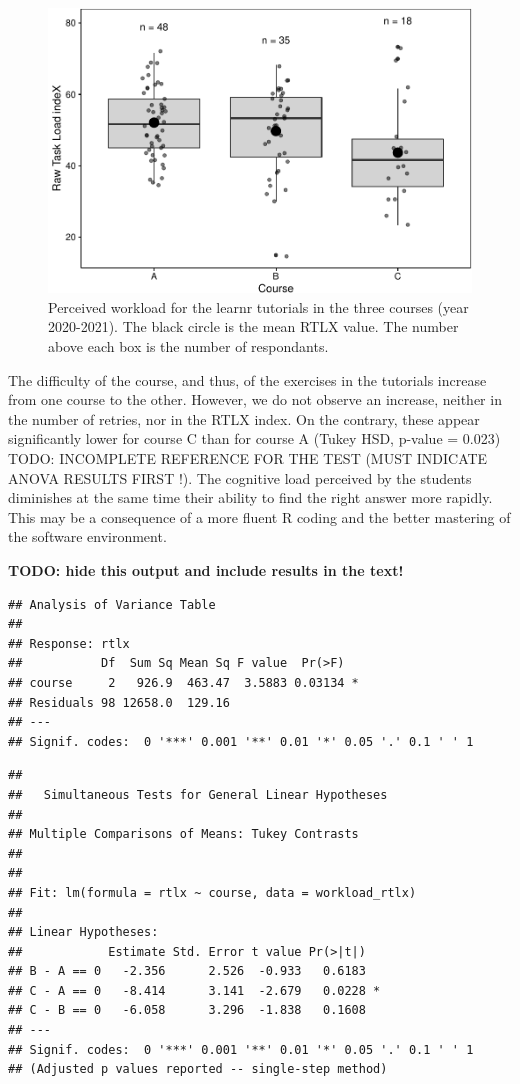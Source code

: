 \documentclass[
]{article}
\begin{document}
\begin{figure}
\centering
\includegraphics{teaching_data_science_files/figure-latex/fig_rtlx-1.pdf}
\caption{Perceived workload for the learnr tutorials in the three
courses (year 2020-2021). The black circle is the mean RTLX value. The
number above each box is the number of respondants.}
\end{figure}

The difficulty of the course, and thus, of the exercises in the
tutorials increase from one course to the other. However, we do not
observe an increase, neither in the number of retries, nor in the RTLX
index. On the contrary, these appear significantly lower for course C
than for course A (Tukey HSD, p-value = 0.023) TODO: INCOMPLETE
REFERENCE FOR THE TEST (MUST INDICATE ANOVA RESULTS FIRST !). The
cognitive load perceived by the students diminishes at the same time
their ability to find the right answer more rapidly. This may be a
consequence of a more fluent R coding and the better mastering of the
software environment.

\textbf{TODO: hide this output and include results in the text!}

\begin{verbatim}
## Analysis of Variance Table
## 
## Response: rtlx
##           Df  Sum Sq Mean Sq F value  Pr(>F)  
## course     2   926.9  463.47  3.5883 0.03134 *
## Residuals 98 12658.0  129.16                  
## ---
## Signif. codes:  0 '***' 0.001 '**' 0.01 '*' 0.05 '.' 0.1 ' ' 1
\end{verbatim}

\begin{verbatim}
## 
##   Simultaneous Tests for General Linear Hypotheses
## 
## Multiple Comparisons of Means: Tukey Contrasts
## 
## 
## Fit: lm(formula = rtlx ~ course, data = workload_rtlx)
## 
## Linear Hypotheses:
##            Estimate Std. Error t value Pr(>|t|)  
## B - A == 0   -2.356      2.526  -0.933   0.6183  
## C - A == 0   -8.414      3.141  -2.679   0.0228 *
## C - B == 0   -6.058      3.296  -1.838   0.1608  
## ---
## Signif. codes:  0 '***' 0.001 '**' 0.01 '*' 0.05 '.' 0.1 ' ' 1
## (Adjusted p values reported -- single-step method)
\end{verbatim}
\end{document}

